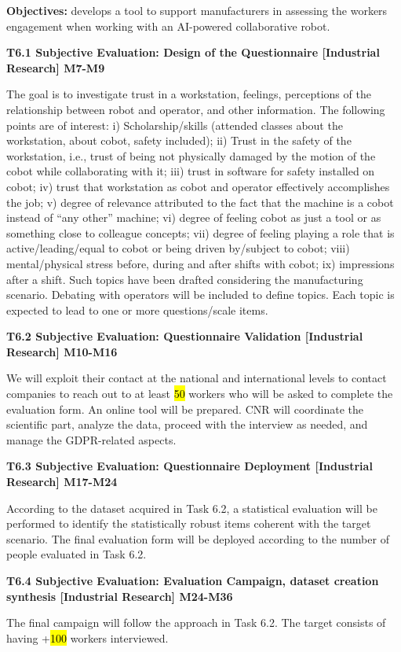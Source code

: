 
\begin{planactivitybody}
\textbf{Objectives:}  develops a tool to support
manufacturers in assessing the workers\textquotesingle{} engagement when
working with an AI-powered collaborative robot.

\plantaskskip
\textbf{T6.1 Subjective Evaluation: Design of the Questionnaire
{[}Industrial Research{]} M7-M9}

The goal is to investigate trust in a workstation, feelings, perceptions
of the relationship between robot and operator, and other information.
The following points are of interest: i) Scholarship/skills (attended
classes about the workstation, about cobot, safety included); ii) Trust
in the safety of the workstation, i.e., trust of being not physically
damaged by the motion of the cobot while collaborating with it; iii)
trust in software for safety installed on cobot; iv) trust that
workstation as cobot and operator effectively accomplishes the job; v)
degree of relevance attributed to the fact that the machine is a cobot
instead of ``any other'' machine; vi) degree of feeling cobot as just a
tool or as something close to colleague concepts; vii) degree of feeling
playing a role that is active/leading/equal to cobot or being driven
by/subject to cobot; viii) mental/physical stress before, during and
after shifts with cobot; ix) impressions after a shift. Such topics have
been drafted considering the manufacturing scenario. Debating with
operators will be included to define topics. Each topic is expected to
lead to one or more questions/scale items.

\plantaskskip
\textbf{T6.2 Subjective Evaluation: Questionnaire Validation
{[}Industrial Research{]} M10-M16}

We will exploit their contact at the national and international levels
to contact companies to reach out to at least \hl{50} workers who will
be asked to complete the evaluation form. An online tool will be
prepared. CNR will coordinate the scientific part, analyze the data,
proceed with the interview as needed, and manage the GDPR-related
aspects.

\plantaskskip
\textbf{T6.3 Subjective Evaluation: Questionnaire Deployment
{[}Industrial Research{]} M17-M24}

According to the dataset acquired in Task 6.2, a statistical evaluation
will be performed to identify the statistically robust items coherent
with the target scenario. The final evaluation form will be deployed
according to the number of people evaluated in Task 6.2.

\plantaskskip
\textbf{T6.4 Subjective Evaluation: Evaluation Campaign, dataset
creation synthesis {[}Industrial Research{]} M24-M36}

The final campaign will follow the approach in Task 6.2. The target
consists of having +\hl{100} workers interviewed.
\end{planactivitybody}

